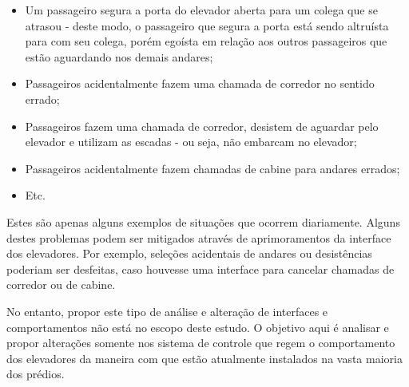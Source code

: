 \begin{itemize}
  \item Um passageiro segura a porta do elevador aberta para um colega que se atrasou - deste modo, o passageiro que segura a porta está sendo altruísta para com seu colega, porém egoísta em relação aos outros passageiros que estão aguardando nos demais andares;
  \item Passageiros acidentalmente fazem uma chamada de corredor no sentido errado;
  \item Passageiros fazem uma chamada de corredor, desistem de aguardar pelo elevador e utilizam as escadas - ou seja, não embarcam no elevador;
  \item Passageiros acidentalmente fazem chamadas de cabine para andares errados;
  \item Etc.
\end{itemize}

Estes são apenas alguns exemplos de situações que ocorrem diariamente. Alguns destes problemas podem ser mitigados através de aprimoramentos da interface dos elevadores. Por exemplo, seleções acidentais de andares ou desistências poderiam ser desfeitas, caso houvesse uma interface para cancelar chamadas de corredor ou de cabine.

No entanto, propor este tipo de análise e alteração de interfaces e comportamentos não está no escopo deste estudo. O objetivo aqui é analisar e propor alterações somente nos sistema de controle que regem o comportamento dos elevadores da maneira com que estão atualmente instalados na vasta maioria dos prédios.